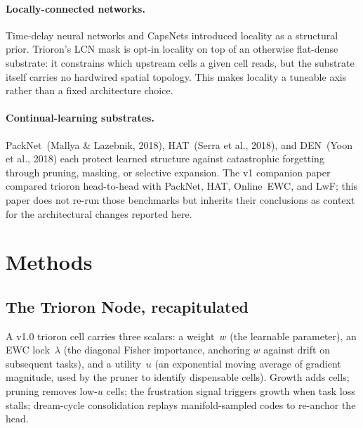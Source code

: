 \documentclass[11pt]{article}
\begin{document}
\paragraph{Locally-connected networks.}
Time-delay neural networks and CapsNets introduced locality as a
structural prior.
Trioron's LCN mask is opt-in locality on top of an otherwise flat-dense
substrate: it constrains which upstream cells a given cell reads, but
the substrate itself carries no hardwired spatial topology.
This makes locality a tuneable axis rather than a fixed architecture
choice.

\paragraph{Continual-learning substrates.}
PackNet~(Mallya \& Lazebnik, 2018), HAT~(Serra et al., 2018), and
DEN~(Yoon et al., 2018) each protect learned structure against
catastrophic forgetting through pruning, masking, or selective
expansion.
The v1 companion paper compared trioron head-to-head with PackNet, HAT,
Online~EWC, and LwF; this paper does not re-run those benchmarks but
inherits their conclusions as context for the architectural changes
reported here.


\section{Methods}
\label{sec:methods}


\subsection{The Trioron Node, recapitulated}
\label{sec:node}

A v1.0 trioron cell carries three scalars: a weight~$w$ (the learnable
parameter), an EWC lock~$\lambda$ (the diagonal Fisher importance,
anchoring $w$ against drift on subsequent tasks), and a utility~$u$
(an exponential moving average of gradient magnitude, used by the pruner
to identify dispensable cells).
Growth adds cells; pruning removes low-$u$ cells; the frustration signal
triggers growth when task loss stalls; dream-cycle consolidation
replays manifold-sampled codes to re-anchor the head.
\end{document}
